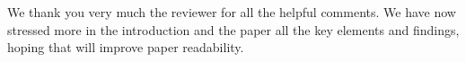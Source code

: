 \begin{reply}
We thank you very much the reviewer for all the helpful comments. We have now stressed more in the introduction and the paper all the key elements and findings, hoping that will improve paper readability.
 
\end{reply}



%
